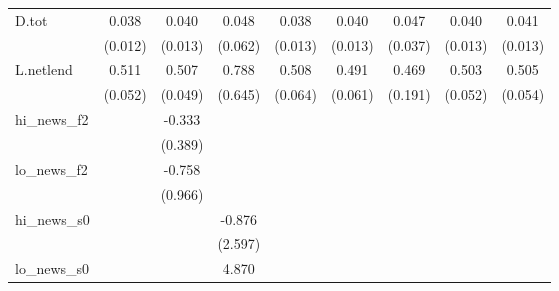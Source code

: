 {\begin{tabular}{l*{8}{c}}
\addlinespace
D.tot       &       0.038\sym{***}&       0.040\sym{***}&       0.048         &       0.038\sym{***}&       0.040\sym{***}&       0.047         &       0.040\sym{***}&       0.041\sym{***}\\
            &     (0.012)         &     (0.013)         &     (0.062)         &     (0.013)         &     (0.013)         &     (0.037)         &     (0.013)         &     (0.013)         \\
\addlinespace
L.netlend   &       0.511\sym{***}&       0.507\sym{***}&       0.788         &       0.508\sym{***}&       0.491\sym{***}&       0.469\sym{**} &       0.503\sym{***}&       0.505\sym{***}\\
            &     (0.052)         &     (0.049)         &     (0.645)         &     (0.064)         &     (0.061)         &     (0.191)         &     (0.052)         &     (0.054)         \\
\addlinespace
hi\_news\_f2  &                     &      -0.333         &                     &                     &                     &                     &                     &                     \\
            &                     &     (0.389)         &                     &                     &                     &                     &                     &                     \\
\addlinespace
lo\_news\_f2  &                     &      -0.758         &                     &                     &                     &                     &                     &                     \\
            &                     &     (0.966)         &                     &                     &                     &                     &                     &                     \\
\addlinespace
hi\_news\_s0  &                     &                     &      -0.876         &                     &                     &                     &                     &                     \\
            &                     &                     &     (2.597)         &                     &                     &                     &                     &                     \\
\addlinespace
lo\_news\_s0  &                     &                     &       4.870         &                     &                     &                     &                     &                     \\

\end{tabular}}
